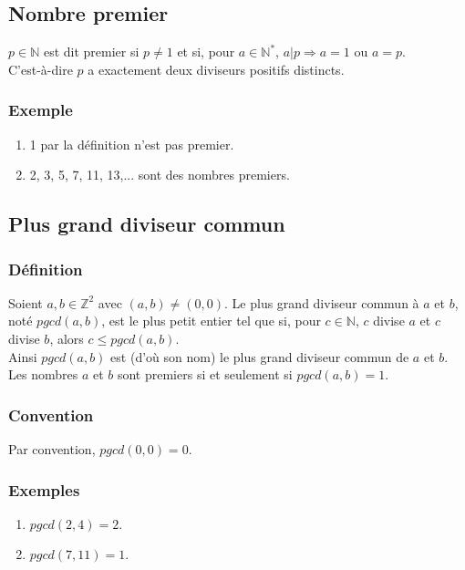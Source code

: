 \documentclass[a4paper,10pt]{book} %
\newcommand{\N}{\mathbb{N}}
\newcommand{\Z}{\mathbb{Z}}
\begin{document}
\subsection{Nombre premier}
$p\in \N$ est dit premier si $p\neq 1$ et si, pour $a\in\N^*$, $a|p\Rightarrow a=1$ ou $a=p$.\\
C'est-à-dire $p$ a exactement deux diviseurs positifs distincts.

\subsubsection{Exemple}
\begin{enumerate}
\item 1 par la définition n'est pas premier.
\item 2, 3, 5, 7, 11, 13,... sont des nombres premiers.
\end{enumerate}

\subsection{Plus grand diviseur commun}
\subsubsection{Définition}
Soient $a,b\in \Z^2$ avec $(a,b)\neq (0,0)$. Le plus grand diviseur commun à $a$ et $b$, noté $pgcd(a,b)$, est le plus petit entier tel que si, pour $c\in \N$, $c$ divise $a$ et $c$ divise $b$, alors $c\leq pgcd(a,b)$.\\

Ainsi $pgcd(a,b)$ est (d'où son nom) le plus grand diviseur commun de $a$ et $b$.\\

Les nombres $a$ et $b$ sont premiers si et seulement si $pgcd(a,b)=1$.

\subsubsection{Convention}
Par convention, $pgcd(0,0)=0$.

\subsubsection{Exemples}
\begin{enumerate}
\item $pgcd(2,4)=2$.
\item $pgcd(7,11)=1$.
\end{enumerate}
\end{document}
